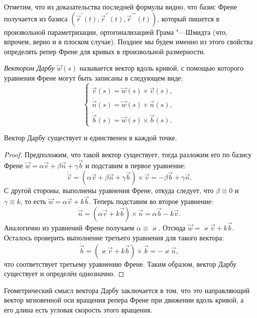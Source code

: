 Отметим, что из доказательства последней формулы видно, что базис Френе получается из базиса $(\vec{r}^\prime(t), \vec{r}^{\prime\prime}(t), \vec{r}^{\prime\prime\prime}(t))$, который пишется в произвольной параметризации, ортогонализацией Грама "---Шмидта (что, впрочем, верно и в плоском случае). Позднее мы будем именно из этого свойства определять репер Френе для кривых в произвольной размерности.

\begin{definition}
	\textit{Вектором Дарбу} $\vec{w}(s)$ называется вектор вдоль кривой, с помощью которого уравнения Френе могут быть записаны в следующем виде:
	\[
		\begin{cases}
			\dot{\vec{v}}(s) = \vec{w}(s) \times \vec{v}(s),\\
			\dot{\vec{n}}(s) = \vec{w}(s) \times \vec{n}(s),\\
			\dot{\vec{b}}(s) = \vec{w}(s) \times \vec{b}(s).
		\end{cases}
	\]
\end{definition}

\begin{theorem}
	Вектор Дарбу существует и единственен в каждой точке.
\end{theorem}

\begin{proof}
	Предположим, что такой вектор существует, тогда разложим его по базису Френе $\vec{w} = \alpha\vec{v} + \beta\vec{n} + \gamma\vec{b}$ и подставим в первое уравнение:
	\[
		\dot{\vec{v}} = (\alpha\vec{v} + \beta\vec{n} + \gamma\vec{b}) \times \vec{v} = -\beta\vec{b} + \gamma\vec{n}.
	\]
	С другой стороны, выполнены уравнения Френе, откуда следует, что $\beta \equiv 0$ и $\gamma \equiv k$, то есть $\vec{w} = \alpha\vec{v} + k\vec{b}$. Теперь подставим во второе уравнение:
	\[
		\dot{\vec{n}} = (\alpha\vec{v} + k\vec{b}) \times \vec{n} = \alpha\vec{b} - k\vec{v}.
	\]
	Аналогично из уравнений Френе получаем $\alpha \equiv \varkappa$. Отсюда $\vec{w} = \varkappa\vec{v} + k\vec{b}$. Осталось проверить выполнение третьего уравнения для такого вектора:
	\[
		\dot{\vec{b}} = (\varkappa\vec{v} + k\vec{b}) \times \vec{b} = -\varkappa\vec{n},
	\]
	что соответствует третьему уравнению Френе. Таким образом, вектор Дарбу существует и определён однозначно.
\end{proof}

Геометрический смысл вектора Дарбу заключается в том, что это направляющий вектор мгновенной оси вращения репера Френе при движении вдоль кривой, а его длина есть угловая скорость этого вращения.

